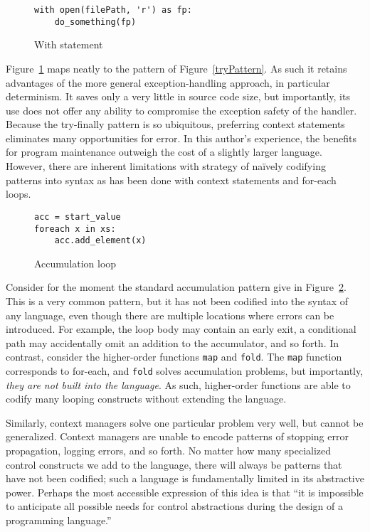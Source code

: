 \documentclass[11pt]{article}
\begin{document}
\begin{figure}[h]
\caption{With statement}
\label{withStatement}
\begin{verbatim}
with open(filePath, 'r') as fp:
    do_something(fp)
\end{verbatim}
\end{figure}

Figure~\ref{withStatement} maps neatly to the pattern of Figure~\ref{tryPattern}.
As such it retains advantages of the more general exception-handling approach, in particular determinism.
It saves only a very little in source code size, but importantly, its use does not offer any ability to compromise the exception safety of the handler.
Because the try-finally pattern is so ubiquitous, preferring context statements eliminates many opportunities for error.
In this author's experience, the benefits for program maintenance outweigh the cost of a slightly larger language.
However, there are inherent limitations with strategy of na\"ively codifying patterns into syntax as has been done with context statements and for-each loops.

\begin{figure}[h]
\caption{Accumulation loop}
\label{accumLoop}
\begin{verbatim}
acc = start_value
foreach x in xs:
    acc.add_element(x)
\end{verbatim}
\end{figure}

Consider for the moment the standard accumulation pattern give in Figure~\ref{accumLoop}.
This is a very common pattern, but it has not been codified into the syntax of any language, even though there are multiple locations where errors can be introduced.
For example, the loop body may contain an early exit, a conditional path may accidentally omit an addition to the accumulator, and so forth.
In contrast, consider the higher-order functions \texttt{map} and \texttt{fold}.
The \texttt{map} function corresponds to for-each, and \texttt{fold} solves accumulation problems, but importantly, \emph{they are not built into the language}.
As such, higher-order functions are able to codify many looping constructs without extending the language.

Similarly, context managers solve one particular problem very well, but cannot be generalized.
Context managers are unable to encode patterns of stopping error propagation, logging errors, and so forth.
No matter how many specialized control constructs we add to the language, there will always be patterns that have not been codified; such a language is fundamentally limited in its abstractive power.
Perhaps the most accessible expression of this idea is that ``it is impossible to anticipate all possible needs for control abstractions during the design of a programming language.''\cite{ControlDelimitersHierarchy}
\end{document}
